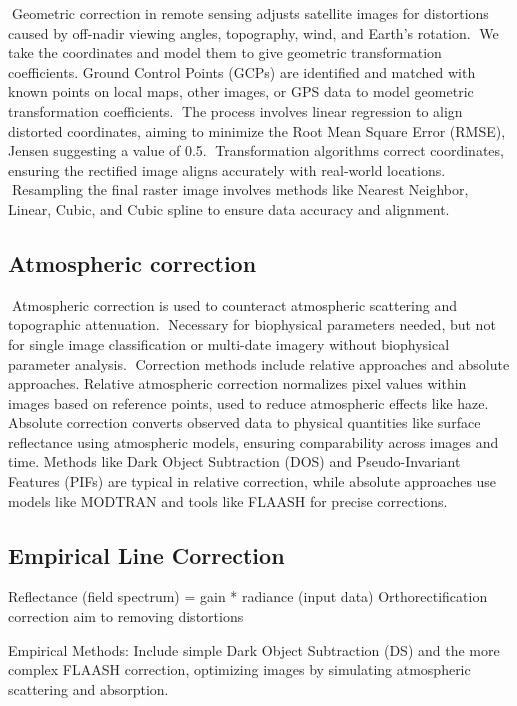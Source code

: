 \documentclass[
  letterpaper,
  DIV=11,
  numbers=noendperiod]{scrreprt}
\begin{document}
Geometric correction in remote sensing adjusts satellite images for
distortions caused by off-nadir viewing angles, topography, wind, and
Earth's rotation. We take the coordinates and model them to give
geometric transformation coefficients. Ground Control Points (GCPs) are
identified and matched with known points on local maps, other images, or
GPS data to model geometric transformation coefficients. The process
involves linear regression to align distorted coordinates, aiming to
minimize the Root Mean Square Error (RMSE), Jensen suggesting a value of
0.5. Transformation algorithms correct coordinates, ensuring the
rectified image aligns accurately with real-world locations. Resampling
the final raster image involves methods like Nearest Neighbor, Linear,
Cubic, and Cubic spline to ensure data accuracy and alignment.

\subsection{Atmospheric correction}\label{atmospheric-correction}

Atmospheric correction is used to counteract atmospheric scattering and
topographic attenuation. Necessary for biophysical parameters needed,
but not for single image classification or multi-date imagery without
biophysical parameter analysis. Correction methods include relative
approaches and absolute approaches. Relative atmospheric correction
normalizes pixel values within images based on reference points, used to
reduce atmospheric effects like haze. Absolute correction converts
observed data to physical quantities like surface reflectance using
atmospheric models, ensuring comparability across images and time.
Methods like Dark Object Subtraction (DOS) and Pseudo-Invariant Features
(PIFs) are typical in relative correction, while absolute approaches use
models like MODTRAN and tools like FLAASH for precise corrections.

\subsection{Empirical Line Correction}\label{empirical-line-correction}

Reflectance (field spectrum) = gain * radiance (input data)
Orthorectification correction aim to removing distortions

Empirical Methods: Include simple Dark Object Subtraction (DS) and the
more complex FLAASH correction, optimizing images by simulating
atmospheric scattering and absorption.
\end{document}
